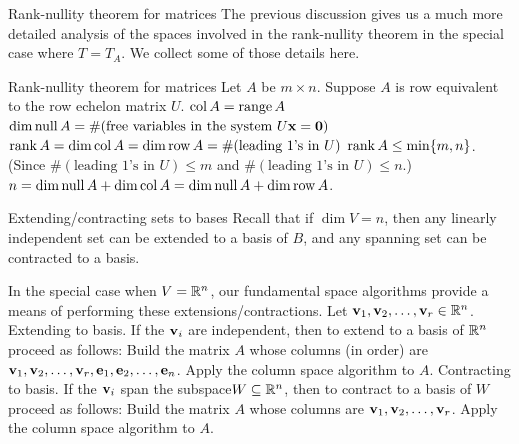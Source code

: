 \begin{frame}{Rank-nullity theorem for matrices}
The previous discussion gives us a much more detailed analysis of the spaces involved in the rank-nullity theorem in the special case where $T=T_A$. We collect some of those details here. 
\begin{block}{Rank-nullity theorem for matrices}
Let $A$ be $m\times n$. Suppose $A$ is row equivalent to the row echelon matrix $U$. 
\bb
\ii $\operatorname{col} A=\operatorname{range} A$
\ii $\dim\operatorname{null} A=\#(\text{free variables in the system $U{\mathbf x}={\mathbf 0}$})$
\ii $\operatorname{rank} A=\dim\operatorname{col} A=\dim\operatorname{row} A=\#(\text{leading 1's in $U$})$
\ii $\operatorname{rank} A\leq \min\{m,n\}$. (Since $\#(\text{leading 1's in $U$})\leq m$ and $\#(\text{leading 1's in $U$})\leq n$.) 
\ii $n=\dim\operatorname{null} A+\dim\operatorname{col} A=\dim\operatorname{null} A+\dim\operatorname{row} A$. 
\ee
\end{block}
\end{frame}
\begin{frame}{Extending/contracting sets to bases}
Recall that if $\dim V=n$, then any linearly independent set can be \alert{extended} to a basis of $B$, and any spanning set can be \alert{contracted} to a basis. 

In the special case when $V={\mathbb R}^n$, our fundamental space algorithms provide a means of performing these extensions/contractions. \bpause
Let ${\mathbf v}_1,{\mathbf v}_2, \dots, {\mathbf v}_r\in {\mathbb R}^n$. 
\bb
\ii \alert{Extending to basis}. If the ${\mathbf v}_i$ are independent, then to extend to a basis of ${\mathbb R}^n$ proceed as follows:
\bb
\ii Build the matrix $A$ whose columns (in order) are ${\mathbf v}_1,{\mathbf v}_2, \dots, {\mathbf v}_r, {\mathbf e}_1,{\mathbf e}_2,\dots, {\mathbf e}_n$.
\ii Apply the column space algorithm to $A$. 
\ee
\ii \alert{Contracting to basis}. If the ${\mathbf v}_i$ span the subspace$W\subseteq{\mathbb R}^n$, then to contract to a basis of $W$ proceed as follows:
\bb
\ii Build the matrix $A$ whose columns are ${\mathbf v}_1, {\mathbf v}_2, \dots, {\mathbf v}_r$. 
\ii Apply the column space algorithm to $A$. 
\ee


\ee
\end{frame}
